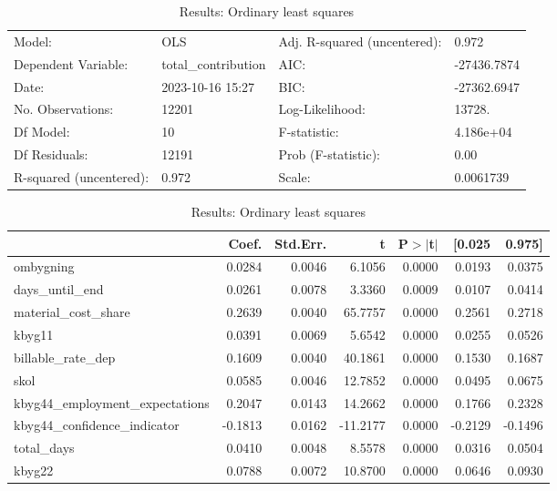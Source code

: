 \begin{table}
\caption{Results: Ordinary least squares}
\label{}
\begin{center}
\begin{tabular}{llll}
\hline
Model:                  & OLS                 & Adj. R-squared (uncentered): & 0.972        \\
Dependent Variable:     & total\_contribution & AIC:                         & -27436.7874  \\
Date:                   & 2023-10-16 15:27    & BIC:                         & -27362.6947  \\
No. Observations:       & 12201               & Log-Likelihood:              & 13728.       \\
Df Model:               & 10                  & F-statistic:                 & 4.186e+04    \\
Df Residuals:           & 12191               & Prob (F-statistic):          & 0.00         \\
R-squared (uncentered): & 0.972               & Scale:                       & 0.0061739    \\
\hline
\end{tabular}
\end{center}

\begin{center}
\begin{tabular}{lrrrrrr}
\hline
                                 &   Coef. & Std.Err. &        t & P$> |$t$|$ &  [0.025 &  0.975]  \\
\hline
ombygning                        &  0.0284 &   0.0046 &   6.1056 &      0.0000 &  0.0193 &  0.0375  \\
days\_until\_end                 &  0.0261 &   0.0078 &   3.3360 &      0.0009 &  0.0107 &  0.0414  \\
material\_cost\_share            &  0.2639 &   0.0040 &  65.7757 &      0.0000 &  0.2561 &  0.2718  \\
kbyg11                           &  0.0391 &   0.0069 &   5.6542 &      0.0000 &  0.0255 &  0.0526  \\
billable\_rate\_dep              &  0.1609 &   0.0040 &  40.1861 &      0.0000 &  0.1530 &  0.1687  \\
skol                             &  0.0585 &   0.0046 &  12.7852 &      0.0000 &  0.0495 &  0.0675  \\
kbyg44\_employment\_expectations &  0.2047 &   0.0143 &  14.2662 &      0.0000 &  0.1766 &  0.2328  \\
kbyg44\_confidence\_indicator    & -0.1813 &   0.0162 & -11.2177 &      0.0000 & -0.2129 & -0.1496  \\
total\_days                      &  0.0410 &   0.0048 &   8.5578 &      0.0000 &  0.0316 &  0.0504  \\
kbyg22                           &  0.0788 &   0.0072 &  10.8700 &      0.0000 &  0.0646 &  0.0930  \\
\hline
\end{tabular}
\end{center}


\end{table}
